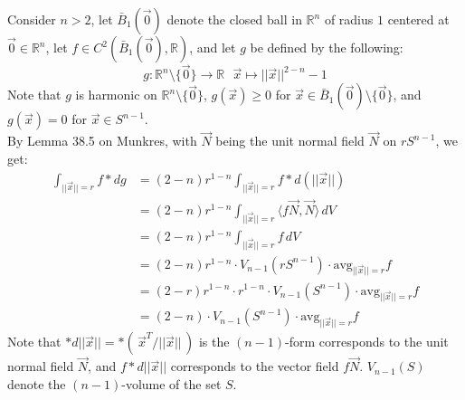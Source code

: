 \documentclass[11pt,oneside]{book}
\theoremstyle{break}
\theoremstyle{break}
\newcommand{\R}{\mathbb{R}}
\begin{document}
Consider $n>2$, let $\bar{B}_1(\vec{0})$ denote the closed ball in $\R^n$ of radius $1$ centered at $\vec{0}\in \R^n$, let $f \in C^2(\bar{B}_1(\vec{0}), \R)$, and let $g$ be defined by the following:
$$g:\R^n\setminus\{\vec{0}\} \to \R \ \ \ \vec{x}\mapsto ||\vec{x}||^{2-n} - 1$$ 
Note that $g$ is harmonic on $\R^n \setminus \{ \vec{0}\}$, $g(\vec{x})\geq 0$ for $\vec{x}\in \bar{B}_1(\vec{0}) \setminus \{\vec{0} \}$, and $g(\vec{x}) = 0$ for $\vec{x}\in S^{n-1}$. \\


By Lemma 38.5 on Munkres, with $\vec{N}$ being the unit normal field $\vec{N}$ on $rS^{n-1}$, we get:
\begin{align*}
\int_{||\vec{x}|| = r} f*dg &= (2-n) r^{1-n}\int_{||\vec{x}|| = r}f*d(||\vec{x}||)\\
&= (2-n)r^{1-n}\int_{||\vec{x}|| = r}\langle f\vec{N},\vec{N}\rangle\, dV \\
&= (2-n)r^{1-n}\int_{||\vec{x}|| = r}f\, dV\\
&= (2-n)r^{1-n} \cdot V_{n-1}(r S^{n-1}) \cdot \text{avg}_{||\vec{x}|| = r}f \\
&= (2-r)r^{1-n}\cdot r^{1-n}\cdot V_{n-1}(S^{n-1}) \cdot \text{avg}_{||\vec{x}|| = r}f\\
&= (2-n)\cdot V_{n-1}(S^{n-1}) \cdot \text{avg}_{||\vec{x}|| = r}f
\end{align*}
Note that $*d||\vec{x}|| =*(\, \vec{x}^T/||\vec{x}||\,)$ is the $(n-1)$-form corresponds to the unit normal field $\vec{N}$, and $f*d||\vec{x}||$ corresponds to the vector field $f\vec{N}$. $V_{n-1}(S)$ denote the $(n-1)$-volume of the set $S$. \\
\end{document}
